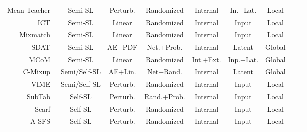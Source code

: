 \begin{longtable}{rcccccccc}
    Mean Teacher~\cite{tarvainen2017mean} & Semi-SL & Perturb. & Randomized & Internal & In.+Lat. & Local \\
    ICT~\cite{verma2022interpolation} & Semi-SL & Linear & Randomized & Internal & Input & Local \\
    Mixmatch~\cite{berthelot2019mixmatch} & Semi-SL & Linear & Randomized & Internal & Input & Local \\
    SDAT~\cite{fang2022semi} & Semi-SL & AE+PDF & Net.+Prob. & Internal & Latent & Global \\
    MCoM~\cite{li2022mcom} & Semi-SL & Linear & Randomized & Int.+Ext. & Inp.+Lat. & Global \\
    C-Mixup~\cite{darabi2021contrastive} & Semi/Self-SL & AE+Lin. & Net+Rand.  & Internal & Latent & Global \\
    VIME~\cite{yoon2020vime} & Semi/Self-SL & Perturb. & Randomized & Internal & Input & Local \\
    SubTab~\cite{ucar2021subtab} & Self-SL & Perturb. & Rand.+Prob. & Internal & Input & Local \\
    Scarf~\cite{bahri2022scarf} & Self-SL & Perturb. & Randomized & Internal & Input & Local \\
    A-SFS~\cite{qiu2022sfs} & Self-SL & Perturb. & Randomized & Internal & Input & Local \\
\end{longtable}
\endgroup

